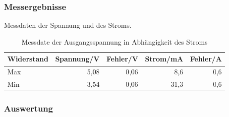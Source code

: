 \documentclass[12pt,a4paper]{article}
\begin{document}
\subsubsection{Messergebnisse}

Messdaten der Spannung und des Stroms.

\begin{table}[H]
\caption{Messdate der Ausgangsspannung in Abhängigkeit des Stroms}
\begin{center}
\begin{tabular}{|l|r|r|r|r|}
\hline
Widerstand & \multicolumn{1}{l|}{Spannung/V} & \multicolumn{1}{l|}{Fehler/V} & \multicolumn{1}{l|}{Strom/mA} & \multicolumn{1}{l|}{Fehler/A} \\ \hline
Max & 5,08 & 0,06 & 8,6 & 0,6 \\ \hline
Min & 3,54 & 0,06 & 31,3 & 0,6 \\ \hline
\end{tabular}
\end{center}
\label{tab:3_1}
\end{table}


\subsubsection{Auswertung}
\end{document}
